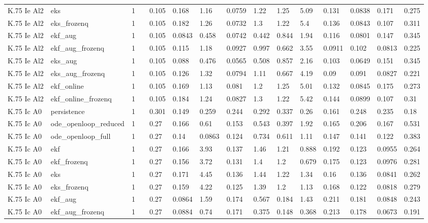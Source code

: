 \begin{table}[t]
\begin{tabular}{lllllllllllllll}
K.75 Ie Al2 & eks & 1 &  & 0.105 & 0.168 & 1.16 & 0.0759 & 1.22 & 1.25 & 5.09 & 0.131 & 0.0838 & 0.171 & 0.275 \\
K.75 Ie Al2 & eks\_frozenq & 1 &  & 0.105 & 0.182 & 1.26 & 0.0732 & 1.3 & 1.22 & 5.4 & 0.136 & 0.0843 & 0.107 & 0.311 \\
K.75 Ie Al2 & ekf\_aug & 1 &  & 0.105 & 0.0843 & 0.458 & 0.0742 & 0.442 & 0.844 & 1.94 & 0.116 & 0.0801 & 0.147 & 0.345 \\
K.75 Ie Al2 & ekf\_aug\_frozenq & 1 &  & 0.105 & 0.115 & 1.18 & 0.0927 & 0.997 & 0.662 & 3.55 & 0.0911 & 0.102 & 0.0813 & 0.225 \\
K.75 Ie Al2 & eks\_aug & 1 &  & 0.105 & 0.088 & 0.476 & 0.0565 & 0.508 & 0.857 & 2.16 & 0.103 & 0.0649 & 0.151 & 0.345 \\
K.75 Ie Al2 & eks\_aug\_frozenq & 1 &  & 0.105 & 0.126 & 1.32 & 0.0794 & 1.11 & 0.667 & 4.19 & 0.09 & 0.091 & 0.0827 & 0.221 \\
K.75 Ie Al2 & ekf\_online & 1 &  & 0.105 & 0.169 & 1.13 & 0.081 & 1.2 & 1.25 & 5.01 & 0.132 & 0.0845 & 0.175 & 0.273 \\
K.75 Ie Al2 & ekf\_online\_frozenq & 1 &  & 0.105 & 0.184 & 1.24 & 0.0827 & 1.3 & 1.22 & 5.42 & 0.144 & 0.0899 & 0.107 & 0.31 \\
K.75 Ic A0 & persistence & 1 &  & 0.301 & 0.149 & 0.259 & 0.244 & 0.292 & 0.337 & 0.26 & 0.161 & 0.248 & 0.235 & 0.18 \\
K.75 Ic A0 & ode\_openloop\_reduced & 1 &  & 0.27 & 0.166 & 0.61 & 0.153 & 0.543 & 0.397 & 1.92 & 0.165 & 0.206 & 0.167 & 0.531 \\
K.75 Ic A0 & ode\_openloop\_full & 1 &  & 0.27 & 0.14 & 0.0863 & 0.124 & 0.734 & 0.611 & 1.11 & 0.147 & 0.141 & 0.122 & 0.383 \\
K.75 Ic A0 & ekf & 1 &  & 0.27 & 0.166 & 3.93 & 0.137 & 1.46 & 1.21 & 0.888 & 0.192 & 0.123 & 0.0955 & 0.264 \\
K.75 Ic A0 & ekf\_frozenq & 1 &  & 0.27 & 0.156 & 3.72 & 0.131 & 1.4 & 1.2 & 0.679 & 0.175 & 0.123 & 0.0976 & 0.281 \\
K.75 Ic A0 & eks & 1 &  & 0.27 & 0.171 & 4.45 & 0.136 & 1.44 & 1.22 & 1.34 & 0.16 & 0.136 & 0.0841 & 0.262 \\
K.75 Ic A0 & eks\_frozenq & 1 &  & 0.27 & 0.159 & 4.22 & 0.125 & 1.39 & 1.2 & 1.13 & 0.168 & 0.122 & 0.0818 & 0.279 \\
K.75 Ic A0 & ekf\_aug & 1 &  & 0.27 & 0.0864 & 1.59 & 0.174 & 0.567 & 0.184 & 1.43 & 0.211 & 0.181 & 0.0848 & 0.243 \\
K.75 Ic A0 & ekf\_aug\_frozenq & 1 &  & 0.27 & 0.0884 & 0.74 & 0.171 & 0.375 & 0.148 & 0.368 & 0.213 & 0.178 & 0.0673 & 0.191 \\

\end{tabular}
\end{table}
